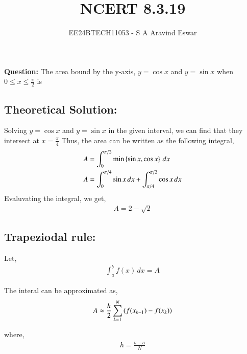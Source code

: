 \documentclass[journal]{IEEEtran}
\begin{document}

\vspace{3cm}

\title{NCERT 8.3.19}
\author{EE24BTECH11053 - S A Aravind Eswar}
{\let\newpage\relax\maketitle}

\renewcommand{\thefigure}{\theenumi}
\renewcommand{\thetable}{\theenumi}
\setlength{\intextsep}{10pt} %

\textbf{Question:} The area bound by the y-axis, $y=\cos{x}$ and $y=\sin{x}$ when $\displaystyle 0\leq x \leq \frac{\pi}{2}$ is

\subsection{Theoretical Solution:}
    Solving $y=\cos{x}$ and $y = \sin{x}$ in the given interval, we can find that they intersect at $x = \frac{\pi}{4}$
    Thus, the area can be written as the following integral,
    \begin{align}
        A &= \int_{0}^{\pi/2} \min\left\{\sin{x}, \cos{x}\right\}\, dx\\
        A &= \int_{0}^{\pi/4} \sin{x}\,dx + \int_{\pi/4}^{\pi/2} \cos{x}\,dx
    \end{align}
    Evaluvating the integral, we get,
    \begin{align}
        A = 2 - \sqrt{2}
    \end{align}

\subsection{Trapeziodal rule:}
    Let,
    \begin{align}
        \int_{a}^{b} f(x) \,dx = A
    \end{align}

    The interal can be approximated as,
    \begin{align}
        A \approx \frac{h}{2} \sum_{k=1}^{N} \left(f(x_{k-1}) - f(x_k)\right)
    \end{align}

    where,
    \begin{align}
        h = \frac{b-a}{N}
    \end{align}
\end{document}
